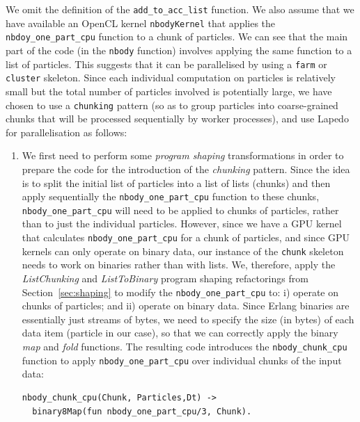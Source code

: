 \documentclass[final]{jfp1}
\makeatletter
\newcommand{\lapedo}{\xspace{\sc Lapedo}\xspace}
\newcommand{\Lapedo}{\lapedo}
\def\thickhrulefill{\leavevmode \leaders \hrule height 0.5pt \hfill \kern \z@}
\newcommand{\hrules}{\vspace{1.5ex}\thickhrulefill}
\newcommand{\hrulee}{\thickhrulefill\vspace{1.5ex}}
\makeatother
\begin{document}
\noindent
We omit the definition of the \lstinline{add_to_acc_list} function. We
also assume that we have available an OpenCL kernel
\lstinline{nbodyKernel} that applies the \lstinline{nbdoy_one_part_cpu}
function to a chunk of particles.
%
We can see that the main part of the code (in the \lstinline{nbody}
function) involves applying the same function to a list of particles.
This suggests that it can be parallelised by using a \lstinline{farm} or
\lstinline{cluster} skeleton. Since 
each individual computation on particles is relatively small but the total
number of particles involved is potentially large,
we have chosen to use a
\lstinline{chunking} pattern (so as to group particles into coarse-grained chunks that
will be processed sequentially by worker processes), and use \Lapedo{} for
parallelisation as follows:
\begin{enumerate}
\item We first need to perform some \emph{program shaping} transformations
  in order to prepare the code for the introduction of the \emph{chunking} pattern. 
  Since the idea is to split the initial list of particles into a list of lists (chunks) and then
  apply sequentially the \lstinline{nbody_one_part_cpu} function to these chunks,
   \lstinline{nbody_one_part_cpu} will need to be applied to chunks of particles, 
   rather than to just the individual particles. However, since we have a GPU kernel that
  calculates \lstinline{nbody_one_part_cpu} for a chunk of particles,
  and since GPU kernels can only operate on binary data, our instance of the
  \lstinline{chunk} skeleton needs to work on binaries rather than with
  lists. We, therefore, apply the \emph{ListChunking} and
  \emph{ListToBinary} program shaping refactorings from Section~\ref{sec:shaping} to modify the
  \lstinline{nbody_one_part_cpu} to: i) operate on chunks of particles; and
  ii) operate on binary data.
  Since Erlang binaries are essentially just streams of bytes, we
  need to specify the size (in bytes) of each data item (particle in our
  case), so that we can correctly apply the binary \emph{map} and \emph{fold}
  functions. 
  The resulting code introduces the
  \lstinline{nbody_chunk_cpu} function to apply
  \lstinline{nbody_one_part_cpu} over individual chunks of the input data:

\begin{lstlisting}
nbody_chunk_cpu(Chunk, Particles,Dt) ->
  binary8Map(fun nbody_one_part_cpu/3, Chunk).
\end{lstlisting}


\end{enumerate}
\end{document}
